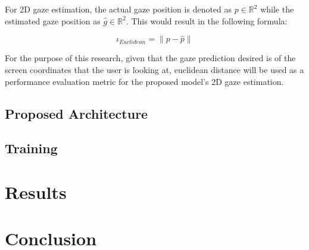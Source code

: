 For 2D gaze estimation, the actual gaze position is denoted as 
\boldmath $p \in \mathbb{R}^2$ while the estimated gaze position as
\boldmath $\hat{g} \in \mathbb{R}^2$. This would result in the following formula:

\begin{equation} \iota _{Euclidean} = \| p - \hat{p} \|  \end{equation}

For the purpose of this research, given that the gaze prediction desired is of the screen coordinates that the user is looking at, euclidean distance will be used
as a performance evaluation metric for the proposed model's 2D gaze estimation.

\section{Proposed Architecture}

\section{Training}

\chapter{Results}
\label{Chap4}


\chapter{Conclusion}
\label{Chap5}
